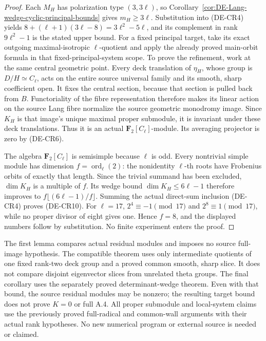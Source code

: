 \begin{proof}
Each \(M_H\) has polarization type \((3,3\ell)\), so
Corollary~\ref{cor:DE-Lang-wedge-cyclic-principal-bounds} gives
\(m_H\ge3\ell\). Substitution into (DE-CR4) yields
\(8+(\ell+1)(3\ell-8)=3\ell^2-5\ell\), and its
complement in rank \(9\ell^2-1\) is the stated upper bound.
For a fixed principal target, take its exact outgoing
maximal-isotropic \(\ell\)-quotient and apply the already
proved main-orbit formula in that fixed-principal-system scope.
To prove the refinement, work at the same central geometric
point. Every deck translation of \(\eta_H\), whose group is
\(D/H\simeq C_\ell\), acts on the entire source universal
family and its smooth, sharp coefficient open. It fixes the
central section, because that section is pulled back from \(B\).
Functoriality of the fibre representation therefore makes its
linear action on the source Lang fibre normalize the source
geometric monodromy image. Since \(K_H\) is that image's unique
maximal proper submodule, it is invariant under these deck
translations. Thus it is an actual \(\mathbf F_2[C_\ell]\)-module.
Its averaging projector is zero by (DE-CR6).

The algebra \(\mathbf F_2[C_\ell]\) is semisimple because
\(\ell\) is odd. Every nontrivial simple module has dimension
\(f=\operatorname{ord}_\ell(2)\): the nonidentity \(\ell\)-th
roots have Frobenius orbits of exactly that length. Since the
trivial summand has been excluded, \(\dim K_H\) is a multiple
of \(f\). Its wedge bound \(\dim K_H\le6\ell-1\) therefore
improves to \(f\lfloor(6\ell-1)/f\rfloor\). Summing the
actual direct-sum inclusion (DE-CR4) proves (DE-CR10).
For \(\ell=17\), \(2^4\equiv-1\pmod {17}\) and
\(2^8\equiv1\pmod {17}\), while no proper divisor of eight
gives one. Hence \(f=8\), and the displayed numbers follow
by substitution. No finite experiment enters the proof.
\end{proof}

\begin{remark}
\label{rem:DE-compatible-residual-module-scope}
The first lemma compares actual residual modules and imposes no
source full-image hypothesis. The compatible theorem uses only
intermediate quotients of one fixed rank-two deck group and a
proved common smooth, sharp slice. It does not compare disjoint
eigenvector slices from unrelated theta groups.
The final corollary uses the separately proved determinant-wedge
theorem. Even with that bound, the source
residual modules may be nonzero; the resulting target bound does
not prove \(K=0\) or full A.4. All proper submodule and local-system
claims use the previously proved full-radical and common-wall
arguments with their actual rank hypotheses. No new numerical
program or external source is needed or claimed.
\end{remark}
